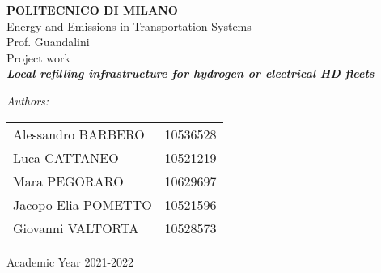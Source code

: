 \thispagestyle{empty}
\vspace*{-1.5cm}
\bfseries{
    \begin{center}
    \large
    \textbf{POLITECNICO DI MILANO}\\
    \Large
    Energy and Emissions in Transportation Systems\\
    \large
    Prof. Guandalini\\
    \vspace*{0.3cm}
    Project work\\
    \LARGE
    \textit{\textbf{Local refilling infrastructure for hydrogen or electrical HD fleets}}\\
    \end{center}
    \vspace*{3.0cm}
    \large
    \vspace*{1.0cm}
    \textit{Authors:}\\
    \begin{table}[h]
    \begin{tabular}{ll}
    Alessandro BARBERO  & 10536528 \\
    Luca CATTANEO       & 10521219 \\
    Mara PEGORARO       & 10629697 \\
    Jacopo Elia POMETTO & 10521596 \\
    Giovanni VALTORTA   & 10528573
    \end{tabular}
    \end{table}
    \vspace*{0.5cm}
    \begin{center}
    Academic Year 2021-2022
    \end{center}
    \clearpage}